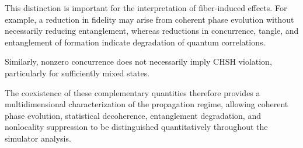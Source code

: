 \medskip

This distinction is important for the interpretation of fiber-induced effects. For example, a reduction in fidelity may arise from coherent phase evolution without necessarily reducing entanglement, whereas reductions in concurrence, tangle, and entanglement of formation indicate degradation of quantum correlations.

Similarly, nonzero concurrence does not necessarily imply CHSH violation, particularly for sufficiently mixed states.

\medskip

The coexistence of these complementary quantities therefore provides a multidimensional characterization of the propagation regime, allowing coherent phase evolution, statistical decoherence, entanglement degradation, and nonlocality suppression to be distinguished quantitatively throughout the simulator analysis.

